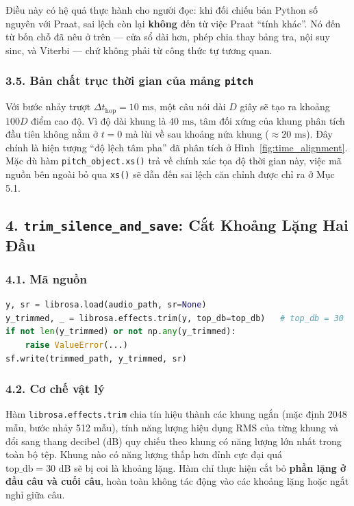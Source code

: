 \documentclass[11pt,a4paper]{article}
\begin{document}
Điều này có hệ quả thực hành cho người đọc: khi đối chiếu bản Python số nguyên với Praat, sai lệch còn lại \textbf{không} đến từ việc Praat ``tính khác''. Nó đến từ bốn chỗ đã nêu ở trên --- cửa sổ dài hơn, phép chia thay bảng tra, nội suy sinc, và Viterbi --- chứ không phải từ công thức tự tương quan.

\subsubsection*{3.5. Bản chất trục thời gian của mảng \texttt{pitch}}
Với bước nhảy trượt $\Delta t_{\text{hop}} = 10\text{ ms}$, một câu nói dài $D$ giây sẽ tạo ra khoảng $100D$ điểm cao độ. Vì độ dài khung là $40\text{ ms}$, tâm đối xứng của khung phân tích đầu tiên không nằm ở $t = 0$ mà lùi về sau khoảng nửa khung ($\approx 20\text{ ms}$). Đây chính là hiện tượng ``độ lệch tâm pha'' đã phân tích ở Hình~\ref{fig:time_alignment}. Mặc dù hàm \texttt{pitch\_object.xs()} trả về chính xác tọa độ thời gian này, việc mã nguồn bên ngoài bỏ qua \texttt{xs()} sẽ dẫn đến sai lệch căn chỉnh được chỉ ra ở Mục 5.1.

\subsection*{4. \texttt{trim\_silence\_and\_save}: Cắt Khoảng Lặng Hai Đầu}

\subsubsection*{4.1. Mã nguồn}
\begin{lstlisting}[language=Python]
y, sr = librosa.load(audio_path, sr=None)
y_trimmed, _ = librosa.effects.trim(y, top_db=top_db)   # top_db = 30
if not len(y_trimmed) or not np.any(y_trimmed):
    raise ValueError(...)
sf.write(trimmed_path, y_trimmed, sr)
\end{lstlisting}

\subsubsection*{4.2. Cơ chế vật lý}
Hàm \texttt{librosa.effects.trim} chia tín hiệu thành các khung ngắn (mặc định 2048 mẫu, bước nhảy 512 mẫu), tính năng lượng hiệu dụng RMS của từng khung và đổi sang thang decibel (dB) quy chiếu theo khung có năng lượng lớn nhất trong toàn bộ tệp. Khung nào có năng lượng thấp hơn đỉnh cực đại quá $\text{top\_db} = 30\text{ dB}$ sẽ bị coi là khoảng lặng. Hàm chỉ thực hiện cắt bỏ \textbf{phần lặng ở đầu câu và cuối câu}, hoàn toàn không tác động vào các khoảng lặng hoặc ngắt nghỉ giữa câu.
\end{document}
